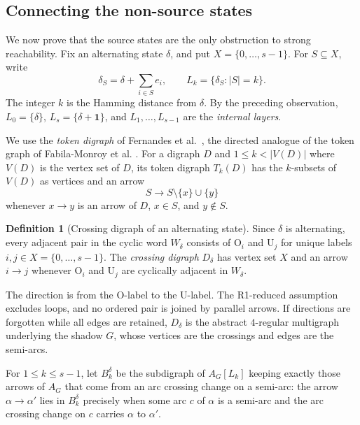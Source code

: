 \documentclass[11pt]{amsart}
\theoremstyle{definition}
\newtheorem*{definitionx}{Definition}
\theoremstyle{remark}
\newcommand{\one}{\mathbf 1}
\begin{document}
\subsection{Connecting the non-source states}\label{sec:non-source-scc}

We now prove that the source states are the only obstruction to strong
reachability.  Fix an alternating state \(\delta\), and put
\(X=\{0,\ldots,s-1\}\).  For \(S\subseteq X\), write
\[
  \delta_S=\delta+\sum_{i\in S}e_i,
  \qquad
  L_k=\{\delta_S:|S|=k\}.
\]
The integer \(k\) is the Hamming distance from \(\delta\).  By
the preceding observation, \(L_0=\{\delta\}\),
\(L_s=\{\delta+\one\}\), and \(L_1,\ldots,L_{s-1}\) are the
\emph{internal layers}.

We use the \emph{token digraph} of Fernandes et al.~\cite{FernandesEtAl2026}, the
directed analogue of the token graph of Fabila-Monroy et al.
\cite{FabilaMonroyEtAl2012}.  For a digraph \(D\) and  
\(1\le k<|V(D)|\) where \(V(D)\)  is the vertex set of \(D\), its token digraph \(T_k(D)\) has the \(k\)-subsets of
\(V(D)\) as vertices and an arrow
\[
  S\longrightarrow S\setminus\{x\}\cup\{y\}
\]
whenever \(x\to y\) is an arrow of \(D\), \(x\in S\), and \(y\notin S\).

\begin{definitionx}[Crossing digraph of an alternating state]
Since \(\delta\) is alternating, every adjacent pair in the cyclic word
\(W_\delta\) consists of \(\mathrm O_i\) and \(\mathrm U_j\) for unique
labels \(i,j\in X=\{0,\ldots,s-1\}\).  The \emph{crossing digraph} \(D_\delta\) has vertex
set \(X\) and an arrow \(i\to j\) whenever \(\mathrm O_i\) and
\(\mathrm U_j\) are cyclically adjacent in \(W_\delta\).
\end{definitionx}

The direction is from the \(\mathrm O\)-label to the \(\mathrm U\)-label.
The R1-reduced assumption excludes loops, and no ordered pair is joined by
parallel arrows.  If directions are forgotten while all edges are retained,
\(D_\delta\) is the abstract \(4\)-regular multigraph underlying the shadow
\(G\), whose vertices are the crossings and edges are the semi-arcs. 

For \(1\le k\le s-1\), let \(B_k^\delta\) be the subdigraph of
\(A_G[L_k]\) keeping exactly those arrows of \(A_G\) that come from an
arc crossing change on a semi-arc: the arrow \(\alpha\to\alpha'\) lies
in \(B_k^\delta\) precisely when some arc \(c\) of \(\alpha\) is a
semi-arc and the arc crossing change on \(c\) carries \(\alpha\) to
\(\alpha'\).
\end{document}
